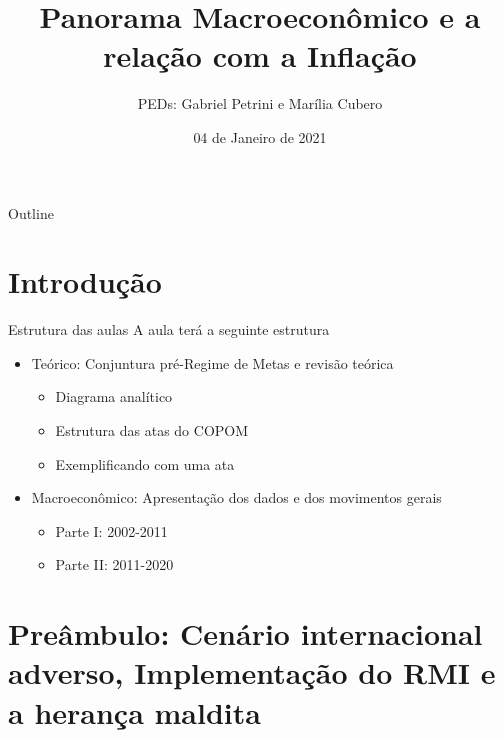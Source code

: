 \documentclass[presentation]{beamer}
\author{PEDs: Gabriel Petrini e Marília Cubero}
\date{04 de Janeiro de 2021}
\title{Panorama Macroeconômico e a relação com a Inflação}
\begin{document}
\maketitle
\begin{frame}{Outline}
\tableofcontents
\end{frame}

\section{Introdução}
\label{sec:org80161f6}

\begin{frame}[label={sec:org54e2f06}]{Estrutura das aulas}
A aula terá a seguinte estrutura
\begin{itemize}
\item \alert{Teórico:} Conjuntura pré-Regime de Metas e revisão teórica
\begin{itemize}
\item Diagrama analítico
\item Estrutura das atas do COPOM
\item Exemplificando com uma ata
\end{itemize}
\item \alert{Macroeconômico:} Apresentação dos dados e dos movimentos gerais
\begin{itemize}
\item Parte I: 2002-2011
\item Parte II: 2011-2020
\end{itemize}
\end{itemize}
\end{frame}


\section{Preâmbulo: Cenário internacional adverso, Implementação do RMI e a herança maldita}
\label{sec:org8467b32}
\end{document}
